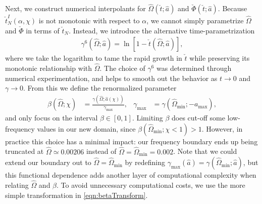 \documentclass[%
 reprint,
 nofootinbib,
 amsmath,amssymb,
 aps,
 prd,
]{revtex4-2}
\begin{document}
Next, we construct numerical interpolants for $\hat{\Omega}(\check{t}; \hat{a})$ and $\check{\Phi}(\check{t}; \hat{a})$. Because $\check{t}_N^I(\alpha, \chi)$ is not monotonic with respect to $\alpha$, we cannot simply parametrize $\hat{\Omega}$ and $\check{\Phi}$ in terms of $\check{t}_N$. Instead, we introduce the alternative time-parametrization
\begin{align} \label{eqn:gammaTransform}
    \gamma^6(\hat{\Omega};\hat{a}) = \ln\left[1 - {\check{t}}(\hat{\Omega};\hat{a})\right],
\end{align}
where we take the logarithm to tame the rapid growth in $\check{t}$ while preserving its monotonic relationship with $\hat{\Omega}$. The choice of $\gamma^6$ was determined through numerical experimentation, and helps to smooth out the behavior as $t\rightarrow 0$ and $\gamma \rightarrow 0$. From this we define the renormalized parameter
\begin{align} \label{eqn:betaTransform}
    \beta(\hat{\Omega}; \chi) &= \frac{\gamma(\hat{\Omega}; \hat{a}(\chi))}{\gamma_\mathrm{max}},
    &
    \gamma_\mathrm{max} &= \gamma(\hat{\Omega}_\mathrm{min};-a_\mathrm{max}),
\end{align}
and only focus on the interval $\beta \in [0, 1]$. Limiting $\beta$ does cut-off some low-frequency values in our new domain, since $\beta(\hat{\Omega}_\mathrm{min}; \chi < 1) > 1$. However, in practice this choice has a minimal impact: our frequency boundary ends up being truncated at $\hat{\Omega} \simeq 0.00206$ instead of $\hat{\Omega} = \hat{\Omega}_\mathrm{min} = 0.002$. Note that we could extend our boundary out to $\hat{\Omega} = \hat{\Omega}_\mathrm{min}$ by redefining $\gamma_\mathrm{max}(\hat{a}) = \gamma(\hat{\Omega}_\mathrm{min}; \hat{a})$, but this functional dependence adds another layer of computational complexity when relating $\hat{\Omega}$ and $\beta$. To avoid unnecessary computational costs, we use the more simple transformation in \eqref{eqn:betaTransform}.
\end{document}
